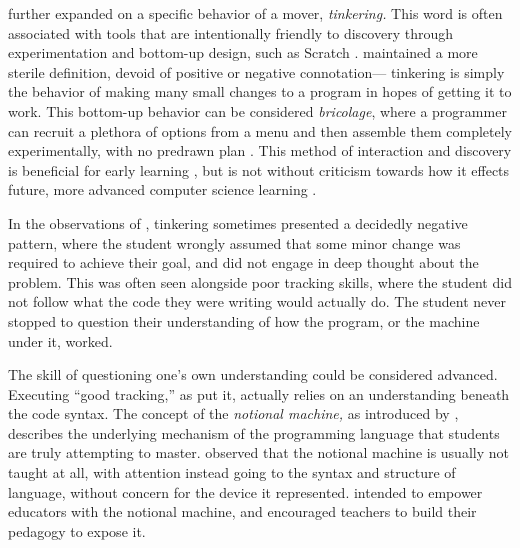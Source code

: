 \citet{perkins-1986} further expanded on a specific behavior of a mover, \emph{tinkering.} This word is often associated with tools that are intentionally friendly to discovery through experimentation and bottom-up design, such as Scratch \citep{resnick2009scratch}. \citeauthor{perkins-1986} maintained a more sterile definition, devoid of positive or negative connotation--- tinkering is simply the behavior of making many small changes to a program in hopes of getting it to work. This bottom-up behavior can be considered \emph{bricolage}, where a programmer can recruit a plethora of options from a menu and then assemble them completely experimentally, with no predrawn plan \citep{turkle1990epistemological, strauss1962savage}. This method of interaction and discovery is beneficial for early learning \citep{turkle1992epistemological}, but is not without criticism towards how it effects future, more advanced computer science learning \citep{Meerbaum-Salant:2011:HPS:1999747.1999796}.

In the observations of \citeauthor{perkins-1986}, tinkering sometimes presented a decidedly negative pattern, where the student wrongly assumed that some minor change was required to achieve their goal, and did not engage in deep thought about the problem. This was often seen alongside poor tracking skills, where the student did not follow what the code they were writing would actually do. The student never stopped to question their understanding of how the program, or the machine under it, worked.

The skill of questioning one's own understanding could be considered advanced. Executing ``good tracking,'' as \citet{perkins-1986} put it, actually relies on an understanding beneath the code syntax. The concept of the \emph{notional machine,} as introduced by \citet{duboulay-1986}, describes the underlying mechanism of the programming language that students are truly attempting to master. \citeauthor{duboulay-1986} observed that the notional machine is usually not taught at all, with attention instead going to the syntax and structure of language, without concern for the device it represented. \citeauthor{duboulay-1986} intended to empower educators with the notional machine, and encouraged teachers to build their pedagogy to expose it. 

